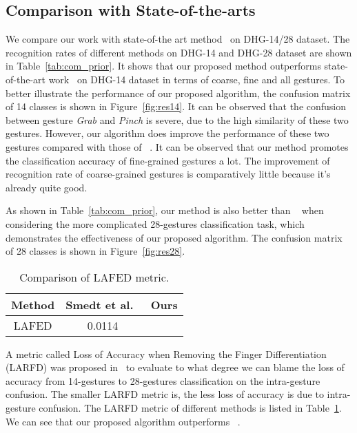 \documentclass{article}
\begin{document}
\subsection{Comparison with State-of-the-arts}
\label{sssec:28gesture}

We compare our work with state-of-the art method~\cite{de2016skeleton} on DHG-14/28 dataset. The recognition rates of different methods on DHG-14 and DHG-28 dataset are shown in Table~\ref{tab:com_prior}. It shows that our proposed method outperforms state-of-the-art work~\cite{de2016skeleton} on DHG-14 dataset in terms of coarse, fine and all gestures. To better illustrate the performance of our proposed algorithm, the confusion matrix of 14 classes is shown in Figure~\ref{fig:res14}. It can be observed that the confusion between gesture {\it{Grab}} and {\it{Pinch}} is severe, due to the high similarity of these two gestures. However, our algorithm does improve the performance of these two gestures compared with those of ~\cite{de2016skeleton}. It can be observed that our method promotes the classification accuracy of fine-grained gestures a lot. The improvement of recognition rate of coarse-grained gestures is comparatively little because it's already quite good.

As shown in Table~\ref{tab:com_prior}, our method is also better than ~\cite{de2016skeleton} when considering the more complicated 28-gestures classification task, which demonstrates the effectiveness of our proposed algorithm.
The confusion matrix of 28 classes is shown in Figure~\ref{fig:res28}.
\begin{table}[!htb]
\centering
\caption{Comparison of LAFED metric.}
\vspace{0.1cm}
\label{tab:lafed}
\begin{tabular}{|c|c|c|}
\hline
Method & Smedt et al.~\cite{de2016skeleton} & Ours \\\hline
LAFED & 0.0114 &  \\\hline
\end{tabular}
\end{table}
A metric called Loss of Accuracy when Removing the Finger Differentiation (LARFD) was proposed in~\cite{de2016skeleton} to evaluate to what degree we can blame the loss of accuracy from 14-gestures to 28-gestures classification on the intra-gesture confusion. The smaller LARFD metric is, the less loss of accuracy is due to intra-gesture confusion. The LARFD metric of different methods is listed in Table~\ref{tab:lafed}. We can see that our proposed algorithm outperforms ~\cite{de2016skeleton}.
\end{document}
